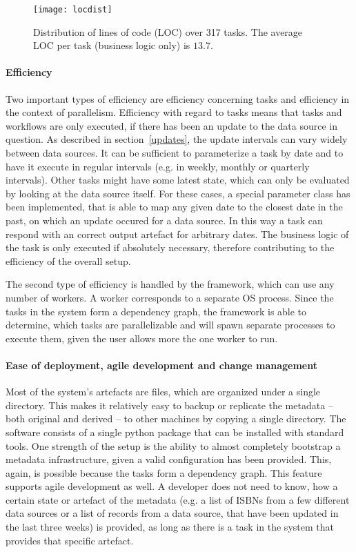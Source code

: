 \documentclass[english]{lni}
\begin{document}
\begin{figure}[htb]
  \begin{center}
    \texttt{[image: locdist]}
    \caption{\label{locfreq}Distribution of lines of code (LOC) over 317 tasks. The average LOC per task (business logic only) is $13.7$.}
  \end{center}
\end{figure}

\paragraph{Efficiency}

Two important types of efficiency are efficiency
concerning tasks and efficiency in the context of parallelism. Efficiency
with regard to tasks means that tasks and workflows are only executed,
if there has been an update to the data source in question. As described
in section~\ref{updates}, the update intervals can vary widely between data sources.
It can be sufficient to parameterize a task by date and to have it
execute in regular intervals (e.g. in weekly, monthly or quarterly intervals).
Other tasks might have some latest state, which can only be evaluated
by looking at the data source itself. For these cases, a special parameter
class has been implemented, that is able to map any given date to the closest
date in the past, on which an update occured for a data source. In this way a task can
respond with an correct output artefact for arbitrary dates. The business logic of the task
is only executed if absolutely necessary, therefore contributing to the efficiency of the overall
setup.

The second type of efficiency is handled by the framework, which can use any
number of workers. A worker corresponds to a separate OS process. Since the tasks
in the system form a dependency graph, the framework is able to determine,
which tasks are parallelizable and will spawn separate processes to execute them, given the user allows
more the one worker to run.

\paragraph{Ease of deployment, agile development and change management}
\label{ease}

Most of the system's artefacts are files, which are organized under a single
directory. This makes it relatively easy to backup or replicate the metadata --
both original and derived -- to other machines by copying a single directory.
The software consists of a single python package that can be installed with
standard tools. One strength of the setup is the ability to almost
completely bootstrap a metadata infrastructure, given a valid configuration
has been provided. This, again, is possible because the tasks form a dependency graph.
This feature supports agile development as well. A developer does not
need to know, how a certain state or artefact of the metadata (e.g. a list
of ISBNs from a few different data sources or a list of records from a data source,
that have been updated in the last three weeks) is provided, as long as there
is a task in the system that provides that specific artefact.
\end{document}
